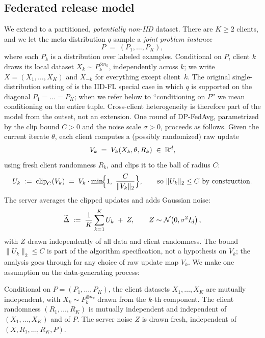 \subsection{Federated release model}\label{sec:setup}
We extend \citet{Brown2021Memorization} to a partitioned, \emph{potentially non-IID} dataset. There are \(K\ge 2\) clients, and we let the meta-distribution \(q\) sample a \emph{joint problem instance}
\[
P\;=\;(P_1,\dots,P_K),
\]
where each \(P_k\) is a distribution over labeled examples. Conditional on \(P\), client \(k\) draws its local dataset \(X_k\sim P_k^{\otimes n_k}\), independently across \(k\); we write \(X=(X_1,\dots,X_K)\) and \(X_{-k}\) for everything except client~\(k\). The original single-distribution setting of \citet{Brown2021Memorization} is the IID-FL special case in which \(q\) is supported on the diagonal \(P_1=\dots=P_K\); when we refer below to ``conditioning on \(P\)'' we mean conditioning on the entire tuple. Cross-client heterogeneity is therefore part of the model from the outset, not an extension. One round of DP-FedAvg, parametrized by the clip bound \(C>0\) and the noise scale \(\sigma>0\), proceeds as follows.
Given the current iterate \(\theta\), each client computes a (possibly randomized) raw update
\[
V_k \;=\; V_k(X_k,\theta,R_k) \;\in\; \mathbb{R}^d,
\]
using fresh client randomness \(R_k\), and clips it to the ball of radius \(C\):
\begin{equation}\label{eq:clip}
U_k \;:=\; \mathrm{clip}_C(V_k) \;=\; V_k \cdot \min\!\Bigl\{1,\ \frac{C}{\|V_k\|_2}\Bigr\}, \qquad\text{so } \|U_k\|_2 \le C \text{ by construction.}
\end{equation}
The server averages the clipped updates and adds Gaussian noise:
\begin{equation}\label{eq:release}
    \widetilde{\Delta} \;:=\; \frac{1}{K}\sum_{k=1}^{K} U_k \;+\; Z, \qquad Z\sim\mathcal{N}\!\left(0,\sigma^2 I_d\right),
\end{equation}
with \(Z\) drawn independently of all data and client randomness. The bound \(\|U_k\|_2\le C\) is part of the algorithm specification, not a hypothesis on \(V_k\); the analysis goes through for any choice of raw update map \(V_k\).
We make one assumption on the data-generating process:

\begin{assumption}\label{ass:indep}
Conditional on \(P=(P_1,\dots,P_K)\), the client datasets \(X_1,\dots,X_K\) are mutually independent, with \(X_k\sim P_k^{\otimes n_k}\) drawn from the \(k\)-th component. The client randomness \((R_1,\dots,R_K)\) is mutually independent and independent of \((X_1,\dots,X_K)\) and of \(P\). The server noise \(Z\) is drawn fresh, independent of \((X,R_1,\dots,R_K,P)\).
\end{assumption}

